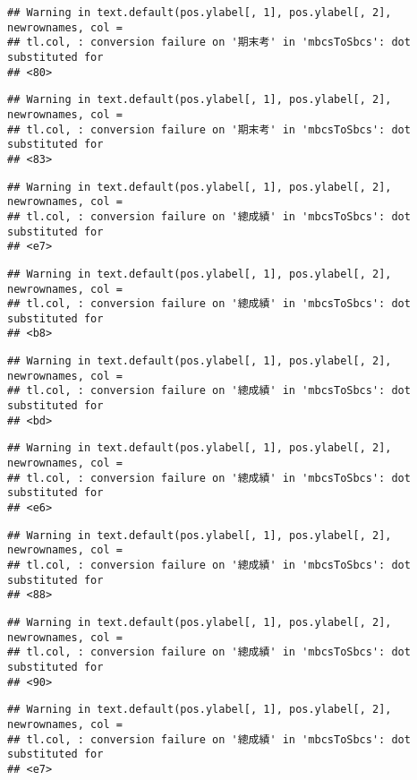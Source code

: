 \documentclass[
]{book}
\begin{document}
\begin{verbatim}
## Warning in text.default(pos.ylabel[, 1], pos.ylabel[, 2], newrownames, col =
## tl.col, : conversion failure on '期末考' in 'mbcsToSbcs': dot substituted for
## <80>
\end{verbatim}

\begin{verbatim}
## Warning in text.default(pos.ylabel[, 1], pos.ylabel[, 2], newrownames, col =
## tl.col, : conversion failure on '期末考' in 'mbcsToSbcs': dot substituted for
## <83>
\end{verbatim}

\begin{verbatim}
## Warning in text.default(pos.ylabel[, 1], pos.ylabel[, 2], newrownames, col =
## tl.col, : conversion failure on '總成績' in 'mbcsToSbcs': dot substituted for
## <e7>
\end{verbatim}

\begin{verbatim}
## Warning in text.default(pos.ylabel[, 1], pos.ylabel[, 2], newrownames, col =
## tl.col, : conversion failure on '總成績' in 'mbcsToSbcs': dot substituted for
## <b8>
\end{verbatim}

\begin{verbatim}
## Warning in text.default(pos.ylabel[, 1], pos.ylabel[, 2], newrownames, col =
## tl.col, : conversion failure on '總成績' in 'mbcsToSbcs': dot substituted for
## <bd>
\end{verbatim}

\begin{verbatim}
## Warning in text.default(pos.ylabel[, 1], pos.ylabel[, 2], newrownames, col =
## tl.col, : conversion failure on '總成績' in 'mbcsToSbcs': dot substituted for
## <e6>
\end{verbatim}

\begin{verbatim}
## Warning in text.default(pos.ylabel[, 1], pos.ylabel[, 2], newrownames, col =
## tl.col, : conversion failure on '總成績' in 'mbcsToSbcs': dot substituted for
## <88>
\end{verbatim}

\begin{verbatim}
## Warning in text.default(pos.ylabel[, 1], pos.ylabel[, 2], newrownames, col =
## tl.col, : conversion failure on '總成績' in 'mbcsToSbcs': dot substituted for
## <90>
\end{verbatim}

\begin{verbatim}
## Warning in text.default(pos.ylabel[, 1], pos.ylabel[, 2], newrownames, col =
## tl.col, : conversion failure on '總成績' in 'mbcsToSbcs': dot substituted for
## <e7>
\end{verbatim}
\end{document}
